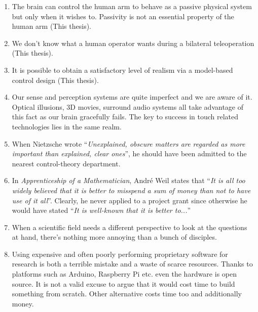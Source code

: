 \documentclass[10pt]{article}%
\newcommand{\mystelling}[1]{%
\item #1
}%
\begin{document}


%
%
%
%
%
\begin{enumerate}
\mystelling{The brain can control the human arm to behave as a passive physical system but only when it 
wishes to. Passivity is not an essential property of the human arm (This thesis).} 

\mystelling{We don't know what a human operator wants during a bilateral teleoperation (This thesis).}

\mystelling{It is possible to obtain a satisfactory level of realism via a model-based control design (This thesis).}

\mystelling{Our sense and perception systems are quite imperfect and we are aware of it. Optical illusions, 
3D movies, surround audio systems all take advantage of this fact as our brain gracefully fails. The key to success 
in touch related technologies lies in the same realm.}

\mystelling{When Nietzsche wrote \enquote{\emph{Unexplained, obscure matters are regarded 
as more important than explained, clear ones}}, he should have been admitted to the 
nearest control-theory department.}

\mystelling{In \emph{Apprenticeship of a Mathematician}, Andr\'{e} Weil states that 
\enquote{\emph{It is all too widely believed that it is better to misspend a sum of 
money than not to have use of it all}}. Clearly, he never applied to a project grant
since otherwise he would have stated \enquote{\emph{It is well-known that it is better to...}}
}

\mystelling{When a scientific field needs a different perspective to look at the questions 
at hand, there's nothing more annoying than a bunch of disciples.}

\mystelling{Using expensive and often poorly performing proprietary software for research 
is both a terrible mistake and a waste of scarce resources. Thanks to platforms such as 
Arduino, Raspberry Pi etc. even the hardware is open source. It is not a valid excuse to 
argue that it would cost time to build something from scratch. Other alternative costs 
time too and additionally money.}


\end{enumerate}
\end{document}
